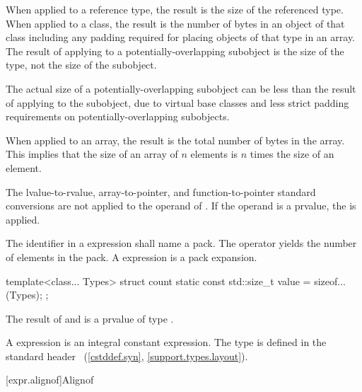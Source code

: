\pnum
{}%
When applied to a reference type, the result is the size
of the referenced type.
%
When applied to a class, the result is the number of bytes in an object
of that class including any padding required for placing objects of that
type in an array.
The result of applying  to a
potentially-overlapping subobject is
the size of the type, not the size of the subobject.
\begin{footnote}
The actual size of a potentially-overlapping subobject
can be less than the result of
applying  to the subobject, due to virtual base classes
and less strict padding requirements on potentially-overlapping subobjects.
\end{footnote}
%
When applied to an array, the result is the total number of bytes in the
array. This implies that the size of an array of $n$ elements is
$n$ times the size of an element.

\pnum
The lvalue-to-rvalue,
array-to-pointer, and
function-to-pointer standard conversions are not
applied to the operand of .
If the operand is a prvalue,
the 
is applied.

\pnum
The identifier in a  expression shall name a
pack. The  operator yields the number of elements
in the pack.
A  expression is a pack expansion.
\begin{example}
\begin{codeblock}
template<class... Types>
struct count {
  static const std::size_t value = sizeof...(Types);
};
\end{codeblock}
\end{example}

\pnum
{}%
%
The result of  and  is a prvalue of type
.
\begin{note}
A  expression
is an integral constant expression.
The type  is defined in the standard header
~(\ref{cstddef.syn}, \ref{support.types.layout}).
\end{note}

[expr.alignof]{Alignof}

